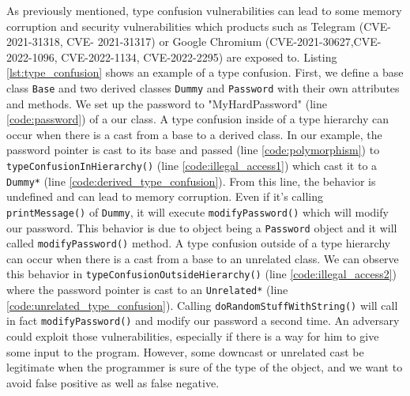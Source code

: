 \documentclass[a4paper,11pt,oneside]{report}
\begin{document}
As previously mentioned, type confusion vulnerabilities can lead to some memory corruption and security vulnerabilities which products such as Telegram (CVE-2021-31318, CVE-
2021-31317) or Google Chromium (CVE-2021-30627,CVE-2022-1096, CVE-2022-1134, CVE-2022-2295) are exposed to. Listing \autoref{lst:type_confusion} shows an example of a type confusion.
First, we define a base class \texttt{Base} and two derived classes \texttt{Dummy} and \texttt{Password} with their own attributes and methods. We set up the password to "MyHardPassword" (line \ref{code:password}) of a our class. 
A type confusion inside of a type hierarchy can occur when there is a cast from a base to a derived class.
In our example, the password pointer is cast to its base and passed (line \ref{code:polymorphism}) to \texttt{typeConfusionInHierarchy()} (line \ref{code:illegal_access1}) which cast it to a \texttt{Dummy*} (line \ref{code:derived_type_confusion}). 
From this line, the behavior is undefined and can lead to memory corruption. Even if it's calling \texttt{printMessage()} of \texttt{Dummy}, it will execute \texttt{modifyPassword()} which will modify our password. 
This behavior is due to object being a \texttt{Password} object and it will called \texttt{modifyPassword()} method.
A type confusion outside of a type hierarchy can occur when there is a cast from a base to an unrelated class. 
We can observe this behavior in \texttt{typeConfusionOutsideHierarchy()} (line \ref{code:illegal_access2})  where the password pointer is cast to an \texttt{Unrelated*} (line \ref{code:unrelated_type_confusion}).
Calling \texttt{doRandomStuffWithString()} will call in fact \texttt{modifyPassword()} and modify our password a second time. 
An adversary could exploit those vulnerabilities, especially if there is a way for him to give some input to the program. 
However, some downcast or unrelated cast be legitimate when the programmer is sure of the type of the object, and we want to avoid false positive as well as false negative.
\end{document}
